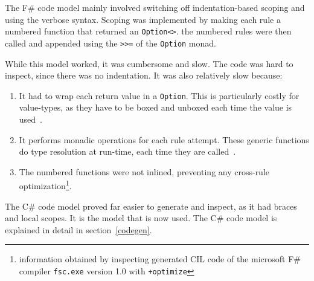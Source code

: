 The F\# code model mainly involved switching off indentation-based scoping and using the verbose syntax.
Scoping was implemented by making each rule a numbered function that returned an \verb|Option<>|.
the numbered rules were then called and appended using the \verb|>>=| of the \verb|Option| monad.

While this model worked, it was cumbersome and slow.
The code was hard to inspect, since there was no indentation.
It was also relatively slow because:

\begin{enumerate}
\item It had to wrap each return value in a \verb|Option|. 
    This is particularly costly for value-types, as they have to be boxed and unboxed each time the value is used~\cite{cisternino}.
\item It performs monadic operations for each rule attempt.
    These generic functions do type resolution at run-time, each time they are called~\cite{cisternino}.
\pagebreak
\item The numbered functions were not inlined, preventing any cross-rule optimization\footnote{information obtained by inspecting generated CIL code of the microsoft F\# compiler \texttt{fsc.exe} version 1.0 with \texttt{+optimize}}.
\end{enumerate}

The C\# code model proved far easier to generate and inspect, as it had braces and local scopes.
It is the model that is now used. The C\# code model is explained in detail in section~\ref{codegen}.

